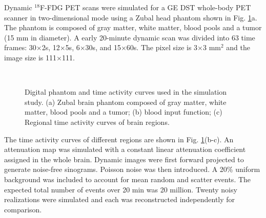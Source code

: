 \documentclass[]{IEEETran}
\begin{document}
	Dynamic $^{18}$F-FDG PET scans were simulated for a GE DST whole-body PET scanner in two-dimensional mode using a Zubal head phantom shown in Fig. \ref{fig:phant}a. The phantom is composed of gray matter, white matter, blood pools and a tumor (15 mm in diameter).  A early 20-minute dynamic scan was divided into 63 time frames: 30$\times$2s, 12$\times$5s, 6$\times$30s, and 15$\times$60s. The pixel size is 3$\times$3 mm$^2$ and the image size is 111$\times$111.
	
	\begin{figure}[t]
		\centering
		\\
		\caption{Digital phantom and time activity curves used in the simulation study. (a) Zubal brain phantom composed of gray matter, white matter, blood pools and a tumor; (b) blood input function; (c) Regional time activity curves of brain regions.}
		\label{fig:phant}	
	\end{figure}
	The time activity curves of different regions are shown in Fig. \ref{fig:phant}(b-c). An attenuation map was simulated with a constant linear attenuation coefficient assigned in the whole brain.  Dynamic images were first forward projected to generate noise-free sinograms. Poisson noise was then introduced. 
	A 20\% uniform background was included to account for mean random and scatter events. The expected total number of events over 20 min was 20 million. Twenty noisy realizations were simulated and each was reconstructed independently for comparison.
	
\end{document}
